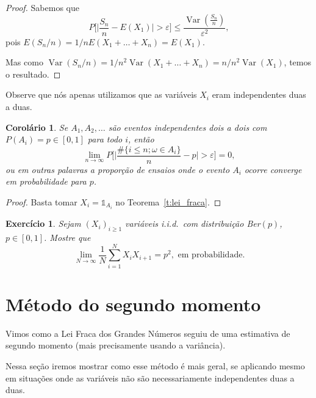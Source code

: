 \documentclass[reqno, final]{book}
\newcommand*\1{\mathds{1}}
\newtheorem{corollary}[theorem]{Corolário}
\newtheorem{exercise}[example]{Exercício}
\DeclareMathOperator{\Var}{Var}
\def \iid{i.i.d.~}
\begin{document}
\begin{proof}
  Sabemos que
  \begin{equation}
    P \Big[\Big| \frac{S_n}{n} - E(X_1)\Big| > \varepsilon \Big] \leq \frac{\Var(\tfrac{S_n}{n})}{\varepsilon^2},
  \end{equation}
  pois $E(S_n/n) = 1/n E(X_1 + \dots + X_n) = E(X_1)$.

  Mas como $\Var(S_n/n) = 1/n^2 \Var (X_1 + \dots + X_n) = n/n^2 \Var(X_1)$, temos o resultado.
\end{proof}

Observe que nós apenas utilizamos que as variáveis $X_i$ eram independentes duas a duas.

\begin{corollary}
  Se $A_1, A_2, \dots$ são eventos independentes dois a dois com $P(A_i) = p \in [0,1]$ para todo $i$, então
  \begin{equation}
    \lim_{n \to \infty} P \Big[ \Big| \frac{\#\{i \leq n; \omega \in A_i\}}{n} - p \Big| > \varepsilon \Big] = 0,
  \end{equation}
  ou em outras palavras a proporção de ensaios onde o evento $A_i$ ocorre converge em probabilidade para $p$.
\end{corollary}

\begin{proof}
  Basta tomar $X_i = \1_{A_i}$ no Teorema~\ref{t:lei_fraca}.
\end{proof}

\begin{exercise}
  Sejam $(X_i)_{i \geq 1}$ variáveis \iid com distribui\c{c}\~ao Ber$(p)$, $p \in [0,1]$. Mostre que
  \begin{equation}
    \lim_{N \to \infty} \frac 1N \sum_{i = 1}^N X_i X_{i+1} = p^2, \text{ em probabilidade.}
  \end{equation}
\end{exercise}


\section{Método do segundo momento}

Vimos como a Lei Fraca dos Grandes Números seguiu de uma estimativa de segundo momento  (mais precisamente usando a variância).

Nessa seção iremos mostrar como esse método é mais geral, se aplicando mesmo em situações onde as variáveis não são necessariamente independentes duas a duas.
\end{document}
